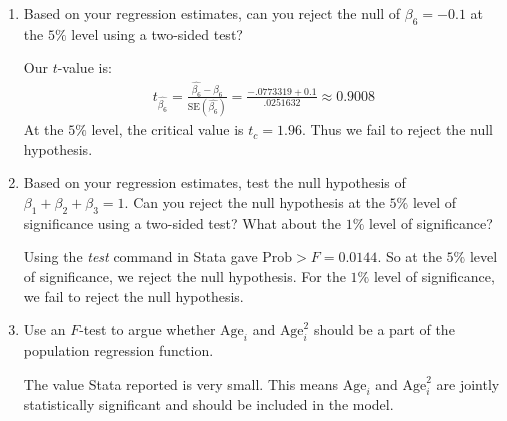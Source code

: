 \documentclass[11pt,twoside,openany]{memoir}
\begin{document}
\begin{question}
\begin{enumerate}[label = (\alph*),itemsep=1pt,topsep=3pt]
            \item Based on your regression estimates, can you reject the null of $\beta_6 = -0.1$ at the $5\%$ level using a two-sided test?
                {\color{blue} \begin{solution}
                    Our $t$-value is:
                        \begin{equation*}
                        \begin{split}
                            t_{\widehat{\beta_6}} = \frac{\widehat{\beta_6} - \beta_6}{\text{SE}(\widehat{\beta_6})} = \frac{-.0773319 + 0.1}{.0251632} \approx 0.9008
                        \end{split}
                        \end{equation*}
                    At the $5\%$ level, the critical value is $t_c = 1.96$. Thus we fail to reject the null hypothesis.
                \end{solution}}

            \item Based on your regression estimates, test the null hypothesis of $\beta_1 + \beta_2 + \beta_3 = 1$. Can you reject the null hypothesis at the $5\%$ level of significance using a two-sided test? What about the $1\%$ level of significance?
                {\color{blue} \begin{solution}
                    Using the \textit{test} command in Stata gave $\text{Prob} > F = 0.0144$. So at the $5\%$ level of significance, we reject the null hypothesis. For the $1\%$ level of significance, we fail to reject the null hypothesis.
                \end{solution}}
            
            \item Use an $F$-test to argue whether $\text{Age}_i$ and $\text{Age}_i^2$ should be a part of the population regression function.
                {\color{blue} \begin{solution}
                    The value Stata reported is very small. This means $\text{Age}_i$ and $\text{{Age}}_i^2$ are jointly statistically significant and should be included in the model.
                \end{solution}}
        \end{enumerate}
    \end{question}
    
\end{document}
